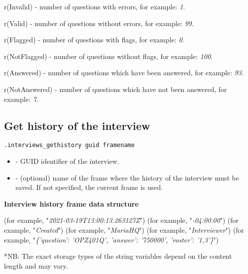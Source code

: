 \begin{compactitem}
    \item r(Invalid) - number of questions with errors, for example: \textit{1}.
    \item r(Valid) - number of questions without errors, for example: \textit{99}.
    \item r(Flagged) - number of questions with flags, for example: \textit{0}.
    \item r(NotFlagged) - number of questions without flags, for example: \textit{100}.
    \item r(Answered) - number of questions which have been answered, for example: \textit{93}.
    \item r(NotAnswered) - number of questions which have not been answered, for example: \textit{7}.
\end{compactitem}

\subsection{Get history of the interview}
\begin{lstlisting}[style=CommandLineStyle]
.interviews_gethistory guid framename
\end{lstlisting}
\paramsheader
\begin{itemize}
    \item {} - GUID identifier of the interview.
    \item {} - (optional) name of the frame where the history
          of the interview must be saved. If not specified, the current frame
          is used.
\end{itemize}
\textbf{Interview history frame data structure}
\begin{compactitem}
     (for example, "\textit{2021-03-19T13:00:13.263127Z}")
     (for example, "\textit{-04:00:00}")
     (for example, "\textit{Created}")
     (for example, "\textit{MariaHQ}")
     (for example, "\textit{Interviewer}")
     (for example, "\textit{\{'question': 'OPZ401Q', 'answer': '750000', 'roster': '1,3'\}}")
\end{compactitem}
*NB: The exact storage types of the string variables depend on the content
     length and may vary.

